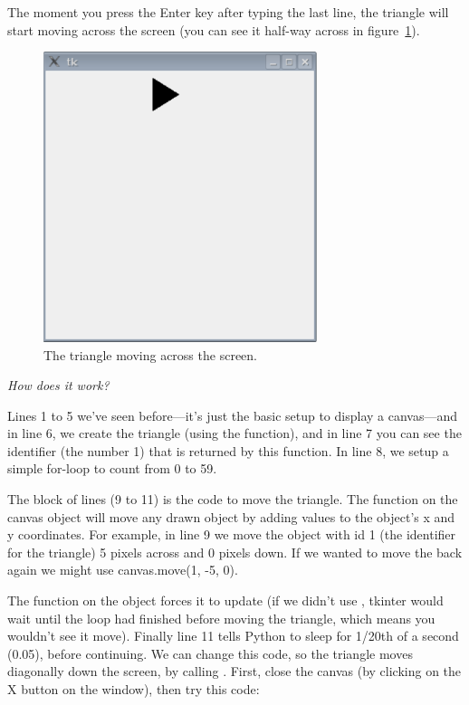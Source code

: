 The moment you press the Enter key after typing the last line, the triangle will start moving across the screen (you can see it half-way across in figure~\ref{fig44}).

\begin{figure}
\begin{center}
\includegraphics[width=80mm]{images/figure44}
\end{center}
\caption{The triangle moving across the screen.}\label{fig44}
\end{figure}

\par
\emph{How does it work?}
\par
Lines 1 to 5 we've seen before---it's just the basic setup to display a canvas---and in line 6, we create the triangle (using the  function), and in line 7 you can see the identifier (the number 1) that is returned by this function. In line 8, we setup a simple for-loop to count from 0 to 59.

The block of lines (9 to 11) is the code to move the triangle. The  function on the canvas object will move any drawn object by adding values to the object's x and y coordinates. For example, in line 9 we move the object with id 1 (the identifier for the triangle) 5 pixels across and 0 pixels down. If we wanted to move the back again we might use canvas.move(1, -5, 0).

The function  on the  object forces it to update (if we didn't use , tkinter would wait until the loop had finished before moving the triangle, which means you wouldn't see it move). Finally line 11 tells Python to sleep for 1/20th of a second (0.05), before continuing. We can change this code, so the triangle moves diagonally down the screen, by calling .  First, close the canvas (by clicking on the X button on the window), then try this code:

